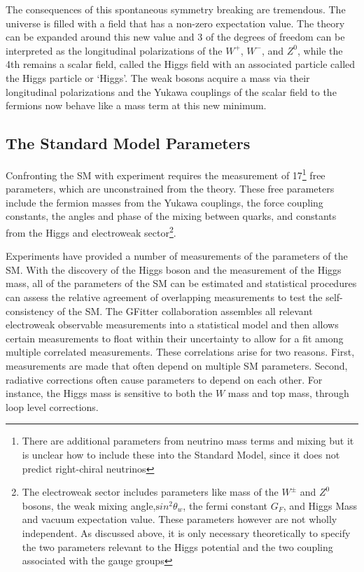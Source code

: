 The consequences of this spontaneous symmetry breaking are tremendous.
The universe is filled with a field that has a non-zero expectation value.
The theory can be expanded around this new value and 3 of the
degrees of freedom can be interpreted as the longitudinal polarizations of
the $W^+$, $W^-$, and $Z^0$, while the 4th remains a scalar field, called
the Higgs field with an associated particle called the Higgs particle or `Higgs'.
The weak bosons acquire a mass via their longitudinal polarizations and the Yukawa
couplings of the scalar field to the fermions now behave like a mass term
at this new minimum. 


\subsection{The Standard Model Parameters}


Confronting the SM with experiment requires the measurement of
17\footnote{There are additional parameters from neutrino mass terms and
mixing but it is unclear how to include these into the Standard Model,
since it does not predict right-chiral neutrinos} free parameters, which
are unconstrained from the theory. These free parameters include the fermion
masses from the Yukawa couplings, the force coupling constants, the angles and phase of the mixing between
quarks, and constants from the Higgs and electroweak sector\footnote{ The electroweak sector includes
parameters like mass of the $W^{\pm}$ and $Z^0$ bosons, the weak mixing
angle,${\mathrm sin^2}\theta_w$, the fermi constant $G_F$, and Higgs
Mass and vacuum expectation value. These parameters however are not
wholly independent. As discussed above, it is only necessary
theoretically to specify the two parameters relevant to the Higgs
potential and the two coupling associated with the gauge groups }.

Experiments have provided a number of measurements of the
parameters of the SM\cite{lepew:2010vi}.  With the discovery of the Higgs boson and 
the measurement of the Higgs mass, all of the parameters
of the SM can be estimated and statistical procedures can assess
the relative agreement of overlapping measurements to test the self-consistency 
of the SM. The GFitter collaboration assembles
all relevant electroweak observable measurements into a statistical
model and then allows certain measurements to float within their
uncertainty to allow for a fit among multiple correlated measurements\cite{GFitter}. 
These correlations arise for two reasons. First, measurements are made that often
depend on multiple SM parameters. Second, radiative corrections often cause 
parameters to depend on each other. For instance, the Higgs mass is sensitive
to both the $W$ mass and top mass, through loop level corrections. 

